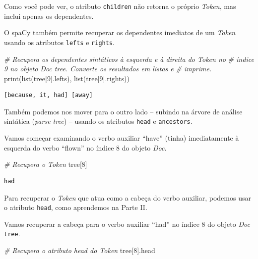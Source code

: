 \documentclass[
  brazilian,
]{article}
\newenvironment{Shaded}{}{}
\newcommand{\BuiltInTok}[1]{#1}
\newcommand{\CommentTok}[1]{\textcolor[rgb]{0.38,0.63,0.69}{\textit{#1}}}
\newcommand{\DecValTok}[1]{\textcolor[rgb]{0.25,0.63,0.44}{#1}}
\newcommand{\NormalTok}[1]{#1}
\begin{document}
Como você pode ver, o atributo \texttt{children} não retorna o próprio
\emph{Token}, mas inclui apenas os dependentes.

O spaCy também permite recuperar os dependentes imediatos de um
\emph{Token} usando os atributos \texttt{lefts} e \texttt{rights}.

\begin{Shaded}
\begin{Highlighting}[]
\CommentTok{\# Recupera os dependentes sintáticos à esquerda e à direita do Token no}
\CommentTok{\# índice 9 no objeto Doc \textquotesingle{}tree\textquotesingle{}. Converte os resultados em listas e}
\CommentTok{\# imprime.}
\BuiltInTok{print}\NormalTok{(}\BuiltInTok{list}\NormalTok{(tree[}\DecValTok{9}\NormalTok{].lefts), }\BuiltInTok{list}\NormalTok{(tree[}\DecValTok{9}\NormalTok{].rights))}
\end{Highlighting}
\end{Shaded}

\begin{verbatim}
[because, it, had] [away]
\end{verbatim}

Também podemos nos mover para o outro lado -- subindo na árvore de
análise sintática (\emph{parse tree}) -- usando os atributos
\texttt{head} e \texttt{ancestors}.

Vamos começar examinando o verbo auxiliar ``have'' (tinha) imediatamente
à esquerda do verbo ``flown'' no índice 8 do objeto \emph{Doc}.

\begin{Shaded}
\begin{Highlighting}[]
\CommentTok{\# Recupera o Token}
\NormalTok{tree[}\DecValTok{8}\NormalTok{]}
\end{Highlighting}
\end{Shaded}

\begin{verbatim}
had
\end{verbatim}

Para recuperar o \emph{Token} que atua como a cabeça do verbo auxiliar,
podemos usar o atributo \texttt{head}, como aprendemos na Parte II.

Vamos recuperar a cabeça para o verbo auxiliar ``had'' no índice 8 do
objeto \emph{Doc} \texttt{tree}.

\begin{Shaded}
\begin{Highlighting}[]
\CommentTok{\# Recupera o atributo \textquotesingle{}head\textquotesingle{} do Token}
\NormalTok{tree[}\DecValTok{8}\NormalTok{].head}
\end{Highlighting}
\end{Shaded}
\end{document}
